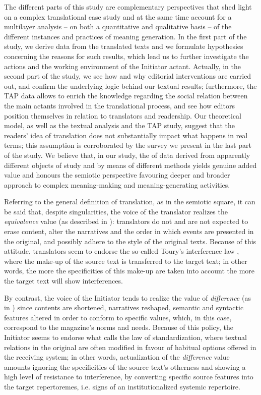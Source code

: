 \documentclass[output=paper]{LSP/langsci}
\begin{document}
The different parts of this study are complementary perspectives that shed light on a complex translational case study and at the same time account for a multilayer analysis -- on both a quantitative and qualitative basis -- of the different instances and practices of meaning generation. In the first part of the study, we derive data from the translated texts and we formulate hypothesies concerning the reasons for such results, which lead us to further investigate the actions and the working environment of the Initiator actant. Actually, in the second part of the study, we see how and why editorial interventions are carried out, and confirm the underlying logic behind our textual results; furthermore, the TAP data allows to enrich the knowledge regarding the social relation between the main actants involved in the translational process, and see how editors position themselves in relation to translators and readership. Our theoretical model, as well as the textual analysis and the TAP study, suggest that the readers' idea of translation does not substantially impact what happens in real terms; this assumption is corroborated by the survey we present in the last part of the study. We believe that, in our study, the  of data derived from apparently different objects of study and by means of different methods yields genuine added value and honours the semiotic perspective favouring deeper and broader approach to complex meaning-making and meaning-generating activities.  

\largerpage
Referring to the general definition of translation, as in the semiotic square, it can be said that, despite singularities, the voice of the translator realizes the \textit{equivalence} value (as described in ): translators do not and are not expected to erase content, alter the narratives and the order in which events are presented in the original, and possibly adhere to the style of the original texts. Because of this attitude, translators seem to endorse the so-called Toury's interference law \citep[276]{Toury1995}, where the make-up of the source text is transferred to the target text; in other words, the more the specificities of this make-up are taken into account the more the target text will show interferences. 

By contrast, the voice of the Initiator tends to realize %
the value of \textit{difference} (as in ) since contents are shortened, narratives reshaped, semantic and syntactic features altered in order to conform to specific values, which, in this case, correspond to the magazine's norms and needs. Because of this policy, the Initiator seems to endorse what \citet[268]{Toury1995} calls the law of standardization, where textual relations in the original are often modified in favour of habitual options offered in the receiving system; in other words, actualization of the \textit{difference} value amounts ignoring the specificities of the source text's otherness and showing a high level of resistance to interference, by converting specific source features into the target repertoremes, i.e. signs of an institutionalized systemic repertoire.
\end{document}
